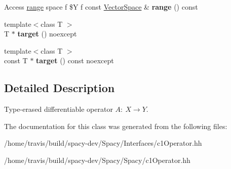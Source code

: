 \begin{DoxyCompactItemize}
\item 
\hypertarget{classSpacy_1_1C1Operator_a1331de78c1c489b846507c3f7461dc15}{\-Access \hyperlink{classSpacy_1_1C1Operator_a7df27427591907b13776e7ba3707bf05}{range} space f \$\-Y f \*
const \hyperlink{classSpacy_1_1VectorSpace}{\-Vector\-Space} \& {\bfseries range} () const }\label{classSpacy_1_1C1Operator_a1331de78c1c489b846507c3f7461dc15}

\item 
\hypertarget{classSpacy_1_1C1Operator_a7c515af344029cf8e60e89d45bf8fade}{{\footnotesize template$<$class T $>$ }\\\-T $\ast$ {\bfseries target} () noexcept}\label{classSpacy_1_1C1Operator_a7c515af344029cf8e60e89d45bf8fade}

\item 
\hypertarget{classSpacy_1_1C1Operator_ab8a5618949b1b861e3085aa085922884}{{\footnotesize template$<$class T $>$ }\\const \-T $\ast$ {\bfseries target} () const noexcept}\label{classSpacy_1_1C1Operator_ab8a5618949b1b861e3085aa085922884}

\end{DoxyCompactItemize}


\subsection{\-Detailed \-Description}
\-Type-\/erased differentiable operator $A:\ X \to Y $. 

\-The documentation for this class was generated from the following files\-:\begin{DoxyCompactItemize}
\item 
/home/travis/build/spacy-\/dev/\-Spacy/\-Interfaces/c1\-Operator.\-hh\item 
/home/travis/build/spacy-\/dev/\-Spacy/\-Spacy/c1\-Operator.\-hh\end{DoxyCompactItemize}
